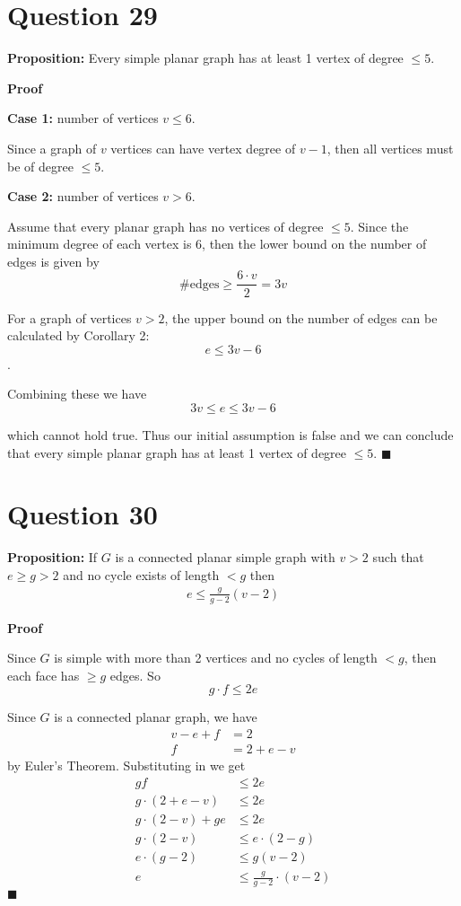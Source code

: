\documentclass[11pt, oneside]{article}   	%
\newcommand*{\QEDA}{\hfill\ensuremath{\blacksquare}}         %
\begin{document}
\section*{Question 29}

\textbf{Proposition:} Every simple planar graph has at least 1 vertex of degree $\leq 5$.

\textbf{Proof} 

\textbf{Case 1:} number of vertices $v \leq 6$.

Since a graph of $v$ vertices can have vertex degree of $v-1$, then all vertices must be of degree $\leq 5$.

\textbf{Case 2:} number of vertices $v > 6$.

Assume that every planar graph has no vertices of degree $\leq 5$. Since the minimum degree of each vertex is 6, then the lower bound on the number of edges is given by
$$\text{\# edges} \geq \frac{6 \cdot v}{2} = 3v$$

For a graph of vertices $v > 2$, the upper bound on the number of edges can be calculated by Corollary 2:
$$e \leq 3v-6$$.

Combining these we have
$$3v \leq e \leq 3v-6$$

which cannot hold true. Thus our initial assumption is false and we can conclude that every simple planar graph has at least 1 vertex of degree $\leq 5$. \QEDA


\section*{Question 30}

\textbf{Proposition:} If $G$ is a connected planar simple graph with $v>2$ such that $e \geq g > 2$ and no cycle exists of length $< g$ then 
\begin{align*}
	e \leq \frac{g}{g-2} (v-2)
	\label{eq1}
\end{align*}

\textbf{Proof}

Since $G$ is simple with more than 2 vertices and no cycles of length $<g$, then each face has $\geq g$ edges. So
$$g \cdot f \leq 2e$$

Since $G$ is a connected planar graph, we have
\begin{align*}
	v-e+f & = 2 \\
	f & = 2+e-v
\end{align*}
by Euler's Theorem. Substituting in we get
\begin{align*}
	gf & \leq 2e \\
	g \cdot(2+e-v) & \leq 2e \\
	g\cdot(2-v) + ge & \leq 2e \\
	g\cdot(2-v) & \leq e\cdot(2-g) \\
	 e\cdot(g-2) & \leq g(v-2) \\
	e & \leq \frac{g}{g-2} \cdot(v-2) 
\end{align*}
\QEDA
\end{document}
